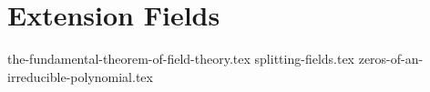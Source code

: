 \chapter{Extension Fields}
{the-fundamental-theorem-of-field-theory.tex}
{splitting-fields.tex}
{zeros-of-an-irreducible-polynomial.tex}
